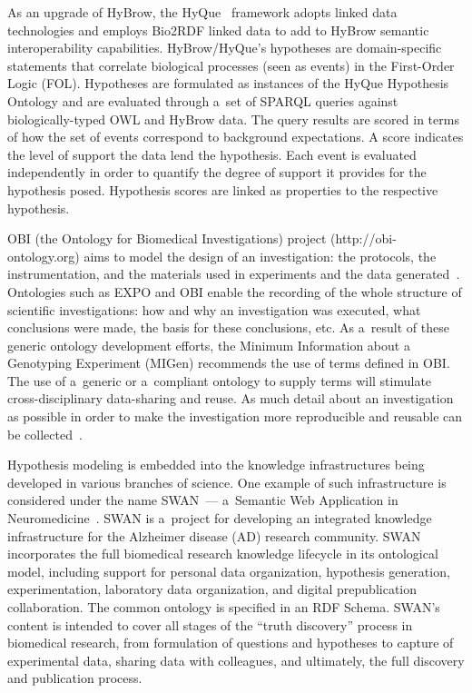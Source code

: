\begin{multicols}{2}
  As an upgrade of HyBrow, the HyQue~\cite{46-kl} framework adopts linked data
technologies and employs Bio2RDF linked data to add to HyBrow semantic
interoperability capabilities. HyBrow/HyQue's hypotheses are domain-specific
statements that correlate biological processes (seen as events) in the First-Order
Logic (FOL). Hypotheses are formulated as instances of the HyQue Hypothesis
Ontology and are evaluated through a~set of SPARQL queries against
  biologically-typed OWL and HyBrow data. The query results are scored in terms
of how the set of events correspond to background expectations. A score indicates the
level of support the data lend the hypothesis.  Each event is evaluated independently
in order to quantify the degree of support it provides for the hypothesis posed.
Hypothesis scores are linked as properties to the respective hypothesis.

  OBI (the Ontology for Biomedical Investigations) project
  ({\sf http://obi-ontology.org}) aims to model the design of an investigation: the
protocols, the instrumentation, and the materials used in experiments and the data
generated~\cite{47-kl}. Ontologies such as EXPO and OBI enable the recording of
the whole structure of scientific investigations: how and why an investigation was
executed, what conclusions were made, the basis for these conclusions, etc. As a~result of these generic ontology development efforts, the Minimum Information about
a Genotyping Experiment (MIGen) recommends the use of terms defined in OBI. The
use of a~generic or a~compliant ontology to supply terms will stimulate
  cross-disciplinary data-sharing and reuse. As much detail about an investigation as
possible in order to make the investigation more reproducible and reusable can be
collected~\cite{48-kl}.

  Hypothesis modeling is embedded into the knowledge infrastructures being
developed in various branches of science. One example of such infrastructure is
considered under the name SWAN~--- a~Semantic Web Application in
Neuromedicine~\cite{47-kl}. SWAN is a~project for developing an integrated
knowledge infrastructure for the Alzheimer disease (AD) research community.
SWAN incorporates the full biomedical research knowledge lifecycle in its
ontological model, including support for personal data organization, hypothesis
generation, experimentation, laboratory data organization, and digital prepublication
collaboration. The common ontology is specified in an RDF Schema. SWAN's
content is intended to cover all stages of the ``truth discovery'' process in biomedical
research, from formulation of questions and hypotheses to capture of experimental
data, sharing data with colleagues, and ultimately, the full discovery and publication
process.


\end{multicols}
